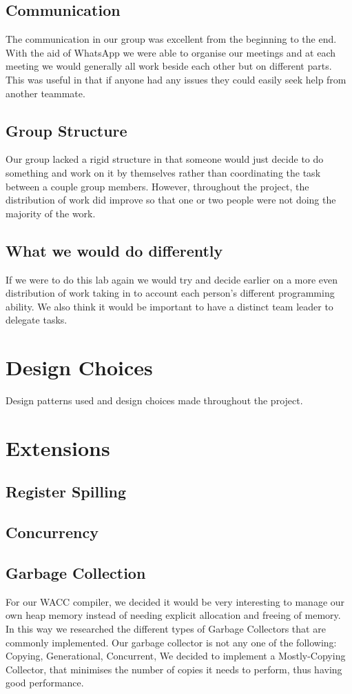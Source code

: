 \documentclass{article}
\begin{document}
\subsection{Communication}
The communication in our group was excellent from the beginning to the end. With the aid of WhatsApp we were able to organise our meetings and at each meeting we would generally all work beside each other but on different parts. This was useful in that if anyone had any issues they could easily seek help from another teammate. 

\subsection{Group Structure}
Our group lacked a rigid structure in that someone would just decide to do something and work on it by themselves rather than coordinating the task between a couple group members. However, throughout the project, the distribution of work did improve so that one or two people were not doing the majority of the work.

\subsection{What we would do differently}
If we were to do this lab again we would try and decide earlier on a more even distribution of work taking in to account each person's different programming ability. We also think it would be important to have a distinct team leader to delegate tasks.

\section{Design Choices}
Design patterns used and design choices made throughout the project.

\section{Extensions}
\subsection{Register Spilling}
\subsection{Concurrency}
\subsection{Garbage Collection}
For our WACC compiler, we decided it would be very interesting to manage our own heap memory instead of needing explicit allocation and freeing of memory. In this way we researched the different types of Garbage Collectors that
are commonly implemented. Our garbage collector is not any one of the following: Copying, Generational, Concurrent,
We decided to implement a Mostly-Copying Collector, that minimises the number of copies it needs to perform, thus 
having good performance.
\end{document}
